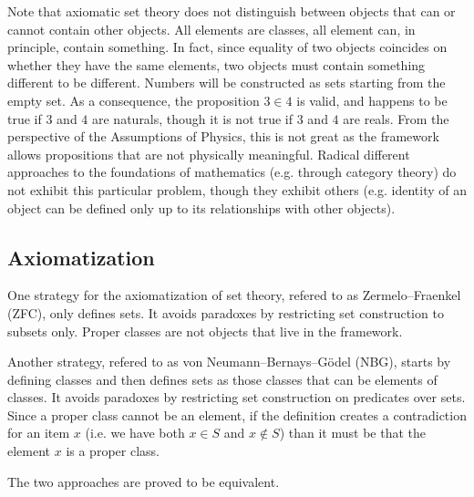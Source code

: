 \documentclass{article}
\begin{document}
Note that axiomatic set theory does not distinguish between objects that can or cannot contain other objects. All elements are classes, all element can, in principle, contain something. In fact, since equality of two objects coincides on whether they have the same elements, two objects must contain something different to be different. Numbers will be constructed as sets starting from the empty set. As a consequence, the proposition $3 \in 4$ is valid, and happens to be true if $3$ and $4$ are naturals, though it is not true if $3$ and $4$ are reals. From the perspective of the Assumptions of Physics, this is not great as the framework allows propositions that are not physically meaningful. Radical different approaches to the foundations of mathematics (e.g. through category theory) do not exhibit this particular problem, though they exhibit others (e.g. identity of an object can be defined only up to its relationships with other objects).

\subsection{Axiomatization}

One strategy for the axiomatization of set theory, refered to as Zermelo–Fraenkel (ZFC), only defines sets. It avoids paradoxes by restricting set construction to subsets only. Proper classes are not objects that live in the framework.

Another strategy, refered to as von Neumann–Bernays–Gödel (NBG), starts by defining classes and then defines sets as those classes that can be elements of classes. It avoids paradoxes by restricting set construction on predicates over sets. Since a proper class cannot be an element, if the definition creates a contradiction for an item $x$ (i.e. we have both $x \in S$ and $x \notin S$) than it must be that the element $x$ is a proper class.

The two approaches are proved to be equivalent.
\end{document}

